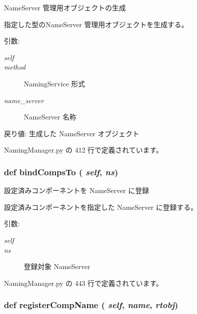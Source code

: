 NameServer 管理用オブジェクトの生成 

指定した型のNameServer 管理用オブジェクトを生成する。

\begin{Desc}
\item[引数:]
\begin{description}
\item[{\em self}]\item[{\em method}]NamingService 形式 \item[{\em name\_\-server}]NameServer 名称\end{description}
\end{Desc}
\begin{Desc}
\item[戻り値:]生成した NameServer オブジェクト \end{Desc}


 NamingManager.py の 412 行で定義されています。
\subsubsection{\setlength{\rightskip}{0pt plus 5cm}def bindCompsTo ( {\em self},  {\em ns})}\label{classsource__py_1_1_naming_manager_1_1_naming_manager_d585cc2a1f92aa728755362acbb586a6}


設定済みコンポーネントを NameServer に登録 

設定済みコンポーネントを指定した NameServer に登録する。

\begin{Desc}
\item[引数:]
\begin{description}
\item[{\em self}]\item[{\em ns}]登録対象 NameServer \end{description}
\end{Desc}


 NamingManager.py の 443 行で定義されています。
\subsubsection{\setlength{\rightskip}{0pt plus 5cm}def registerCompName ( {\em self},  {\em name},  {\em rtobj})}\label{classsource__py_1_1_naming_manager_1_1_naming_manager_8ab35e6f1e77b6d3f24fb27399c1f8e6}


